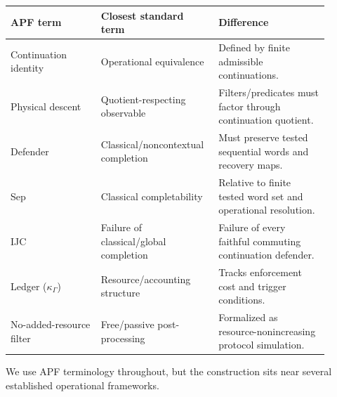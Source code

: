 \documentclass[11pt]{article}
\begin{document}
\begin{center}
\begin{tabular}{p{0.27\linewidth}p{0.30\linewidth}p{0.33\linewidth}}
\toprule
\textbf{APF term} & \textbf{Closest standard term} & \textbf{Difference} \\
\midrule
Continuation identity & Operational equivalence & Defined by finite admissible continuations. \\
Physical descent & Quotient-respecting observable & Filters/predicates must factor through continuation quotient. \\
Defender & Classical/noncontextual completion & Must preserve tested sequential words and recovery maps. \\
Sep & Classical completability & Relative to finite tested word set and operational resolution. \\
IJC & Failure of classical/global completion & Failure of every faithful commuting continuation defender. \\
Ledger ($\kappa_\Gamma$) & Resource/accounting structure & Tracks enforcement cost and trigger conditions. \\
No-added-resource filter & Free/passive post-processing & Formalized as resource-nonincreasing protocol simulation. \\
\bottomrule
\end{tabular}
\end{center}


We use APF terminology throughout, but the construction sits near several established operational frameworks.
\end{document}
